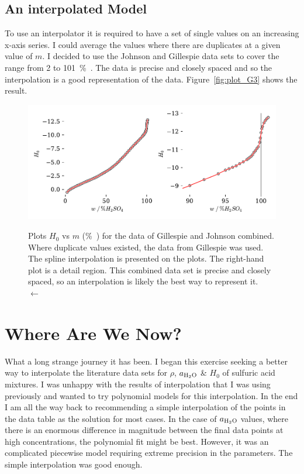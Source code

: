 \documentclass[]{tufte-handout}
\begin{document}
\subsection {An interpolated Model}

To use an interpolator it is required to have a set of single values on an increasing x-axis series. I could average the values where there are duplicates at a given value of $m$. I decided to use the Johnson and Gillespie data sets to cover the range from \num{2} to \qty{101}{\percent{}}. The data is precise and closely spaced and so the interpolation is a good representation of the data. Figure~\vref{fig:plot_G3} shows the result.

\begin{figure}
  \centering
  \caption{Plots $H_0$ vs $m$ (\unit{\percent{}}) for the data of Gillespie and Johnson combined. Where duplicate values existed, the data from Gillespie was used. The spline interpolation is presented on the plots. The right-hand plot is a detail region. This combined data set is precise and closely spaced, so an interpolation is likely the best way to represent it.\\ $\longleftarrow$} 
  \hspace*{-10mm}
 \includegraphics[scale=0.75]{images/plot_G3} 
  \label{fig:plot_G3}
\end{figure}

\section{Where Are We Now?}

What a long strange journey it has been. I began this exercise seeking a better way to interpolate the literature data sets for $\rho$, $a_{\ce{H2O}}$ \& $H_0$ of sulfuric acid mixtures. I was unhappy with the results of interpolation that I was using previously and wanted to try polynomial models for this interpolation. In the end I am all the way back to recommending a simple interpolation of the points in the data table as the solution for most cases. In the case of $a_{\ce{H2O}}$ values, where there is an enormous difference in magnitude between the final data points at high concentrations, the polynomial fit might be best. However, it was an complicated piecewise model requiring extreme precision in the parameters. The simple interpolation was good enough.
\end{document}
